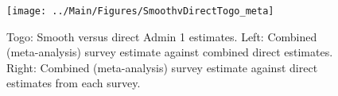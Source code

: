 \documentclass[12pt]{article}\usepackage[]{graphicx}\usepackage[]{color}
\newenvironment{knitrout}{}{} %
\begin{document}

\begin{knitrout}
\color{fgcolor}\begin{figure}[bht]

{\centering \texttt{[image: ../Main/Figures/SmoothvDirectTogo\_meta]} 

}

\caption[Togo]{Togo: Smooth versus direct Admin 1 estimates. Left: Combined (meta-analysis) survey estimate against combined direct estimates. Right: Combined (meta-analysis) survey estimate against direct estimates from each survey.}\label{fig:unnamed-chunk-313}
\end{figure}


\end{knitrout}
\end{document}
